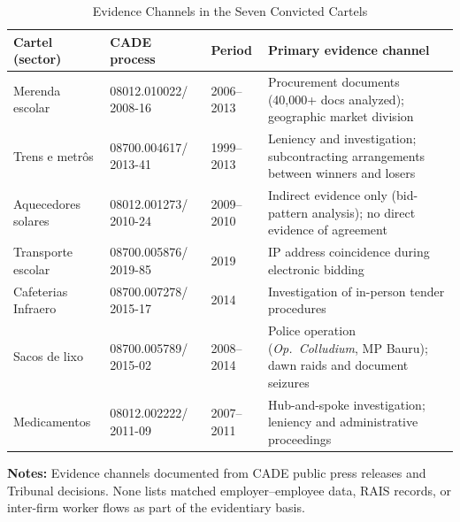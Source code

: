 \begin{table}[htbp]
\centering
\caption{Evidence Channels in the Seven Convicted Cartels}\label{tab:evidence}
\begin{tabular}{p{3.5cm}p{2.5cm}p{2cm}p{5cm}}
\toprule
Cartel (sector) & CADE process & Period & Primary evidence channel \\
\midrule
Merenda escolar & 08012.010022/ 2008-16 & 2006--2013 & Procurement documents (40{,}000+ docs analyzed); geographic market division \\
Trens e metr\^{o}s & 08700.004617/ 2013-41 & 1999--2013 & Leniency and investigation; subcontracting arrangements between winners and losers \\
Aquecedores solares & 08012.001273/ 2010-24 & 2009--2010 & Indirect evidence only (bid-pattern analysis); no direct evidence of agreement \\
Transporte escolar & 08700.005876/ 2019-85 & 2019 & IP address coincidence during electronic bidding \\
Cafeterias Infraero & 08700.007278/ 2015-17 & 2014 & Investigation of in-person tender procedures \\
Sacos de lixo & 08700.005789/ 2015-02 & 2008--2014 & Police operation (\emph{Op.\ Colludium}, MP Bauru); dawn raids and document seizures \\
Medicamentos & 08012.002222/ 2011-09 & 2007--2011 & Hub-and-spoke investigation; leniency and administrative proceedings \\
\bottomrule
\end{tabular}
\vspace{0.5em}
\begin{minipage}{0.95\textwidth}
\scriptsize{\textbf{Notes:} Evidence channels documented from CADE public press releases and Tribunal decisions. None lists matched employer--employee data, RAIS records, or inter-firm worker flows as part of the evidentiary basis.\par}
\end{minipage}
\end{table}


